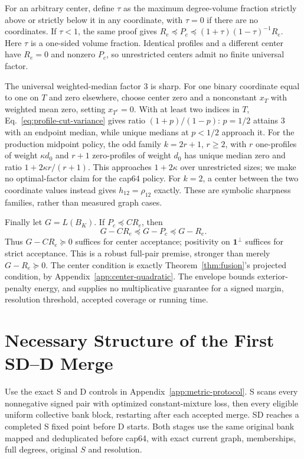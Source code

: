 \documentclass[sigconf,anonymous,review]{acmart}
\newcommand{\1}{\mathbf{1}}
\begin{document}
For an arbitrary center, define $\tau$ as the maximum degree-volume fraction
strictly above or strictly below it in any coordinate, with $\tau=0$ if
there are no coordinates. If $\tau<1$, the same proof gives
$R_e\preceq P_c\preceq(1+\tau)(1-\tau)^{-1}R_e$.
Here $\tau$ is a one-sided volume fraction. Identical profiles and a different
center have $R_e=0$ and nonzero $P_c$, so unrestricted centers admit no finite
universal factor.

The universal weighted-median factor 3 is sharp. For one binary coordinate
equal to one on $T$ and zero elsewhere, choose center zero and a nonconstant
$x_T$ with weighted mean zero, setting $x_{T^c}=0$. With at least two indices
in $T$, Eq.~\eqref{eq:profile-cut-variance} gives ratio
$(1+p)/(1-p)$: $p=1/2$ attains 3 with an endpoint median, while unique
medians at $p<1/2$ approach it. For the production midpoint policy, the odd
family $k=2r+1$, $r\ge2$, with $r$ one-profiles of weight $\kappa d_0$ and
$r+1$ zero-profiles of weight $d_0$ has unique median zero and ratio
$1+2\kappa r/(r+1)$. This approaches $1+2\kappa$ over unrestricted sizes;
we make no optimal-factor claim for the cap64 policy. For $k=2$, a center
between the two coordinate values instead gives $h_{12}=\rho_{12}$ exactly.
These are symbolic sharpness families, rather than measured graph cases.

Finally let $G=L(B_K)$. If $P_c\preceq CR_e$, then
\[
 G-CR_e\preceq G-P_c\preceq G-R_e.
\]
Thus $G-CR_e\succeq0$ suffices for center acceptance; positivity on
$\1^\perp$ suffices for strict acceptance. This is a robust full-pair premise,
stronger than merely $G-R_e\succeq0$. The center condition is exactly
Theorem~\ref{thm:fusion}'s projected condition, by
Appendix~\ref{app:center-quadratic}. The envelope bounds exterior-penalty
energy, and supplies no multiplicative guarantee for a signed margin,
resolution threshold, accepted coverage or running time.

\section{Necessary Structure of the First SD--D Merge}\label{app:sd-first-d}
Use the exact S and D controls in Appendix~\ref{app:metric-protocol}.
S scans every nonnegative signed pair with optimized constant-mixture loss,
then every eligible uniform collective bank block, restarting after each
accepted merge. SD reaches a completed S fixed point before D starts.
Both stages use the same original bank mapped and deduplicated before cap64,
with exact current graph, memberships, full degrees, original $S$ and resolution.
\end{document}
